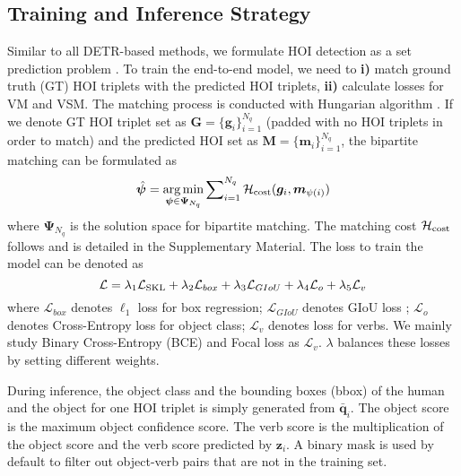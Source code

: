 \documentclass[letterpaper]{article} %
\begin{document}
\subsection{Training and Inference Strategy} 
Similar to all DETR-based methods, we formulate HOI detection as a set prediction problem \cite{carion2020DETR}. To train the end-to-end model, we need to \textbf{i)} match ground truth (GT) HOI triplets with the predicted HOI triplets, \textbf{ii)} calculate losses for VM and VSM. The matching process is conducted with Hungarian algorithm \cite{kuhn1955hungarian}. If we denote GT HOI triplet set as $\bm{G} = \{\bm{g}_i\}_{i=1}^{N_q}$ (padded with no HOI triplets in order to match) and the predicted HOI set as $\bm{M} = \{\bm{m}_i\}_{i=1}^{N_q}$, the bipartite matching can be formulated as
\begin{equation}
    \hat{\bm{\psi}} = \mathop{\arg\min}_{\bm{\psi} \in \bm{\Psi}_{N_q}} \sum\nolimits_{i=1}^{N_q}{\mathcal{H}_{\rm cost}(\bm{g}_{i}, \bm{m}_{\psi(i)})}
\end{equation}
where $\bm{\Psi}_{N_q}$ is the solution space for bipartite matching. The matching cost $\mathcal{H}_{\rm cost}$ follows \cite{tamura2021qpic} and is detailed in the Supplementary Material. The loss to train the model can be denoted as
\begin{equation}
    \mathcal{L} = \lambda_{1} \mathcal{L}_{\rm SKL} + \lambda_{2} \mathcal{L}_{box} + \lambda_{3} \mathcal{L}_{GIoU} + \lambda_{4} \mathcal{L}_{o} + \lambda_{5} \mathcal{L}_{v}
\end{equation}
where $\mathcal{L}_{box}$ denotes $\ell_1$ loss for box regression; $\mathcal{L}_{GIoU}$ denotes GIoU loss \cite{rezatofighi2019GIoU}; $\mathcal{L}_{o}$ denotes Cross-Entropy loss for object class; $\mathcal{L}_{v}$ denotes loss for verbs. We mainly study Binary Cross-Entropy (BCE) and Focal loss \cite{lin2017focal} as $\mathcal{L}_{v}$. $\lambda$ balances these losses by setting different weights.


During inference, the object class and the bounding boxes (bbox) of the human and the object for one HOI triplet is simply generated from $\bar{\bm{q}}_i$. The object score is the maximum object confidence score. The verb score is the multiplication of the object score and the verb score predicted by $\bm{z}_i$. A binary mask is used by default to filter out object-verb pairs that are not in the training set.
\end{document}

